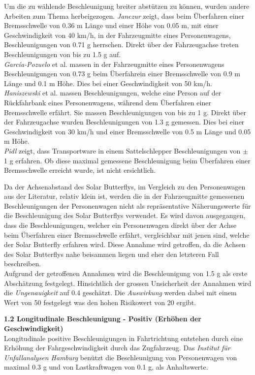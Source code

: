 \begin{description}
    Um die zu wählende Beschleunigung breiter abstützen zu können, wurden andere Arbeiten zum Thema herbeigezogen. \emph{Janczur} \cite{Beschl.1} zeigt, dass beim Überfahren einer Bremsschwelle von 0.36 m Länge und einer Höhe von 0.05 m, mit einer Geschwindigkeit von 40 km/h, in der Fahrzeugmitte eines Personenwagens, Beschleunigungen von 0.71 g herrschen. Direkt über der Fahrzeugachse treten Beschleunigungen von bis zu 1.5 g auf.\\
    \emph{García-Pozuelo} et al. \cite{Beschl.2} massen in der Fahrzeugmitte eines Personenwagens Beschleunigungen von 0.73 g beim Überfahrein einer Bremsschwelle von 0.9 m Länge und 0.1 m Höhe. Dies bei einer Geschwindigkeit von 50 km/h.\\
    \emph{Haniszewski} et al. \cite{Beschl.3} massen Beschleunigungen, welche eine Person auf der Rückfahrbank eines Personenwagens, während dem Überfahren einer Bremsschwelle erfährt. Sie massen Beschleunigungen von bis zu 1 g. Direkt über der Fahrzeugachse wurden Beschleunigungen von 1.3 g gemessen. Dies bei einer Geschwindigkeit von 30 km/h und einer Bremsschwelle von 0.5 m Länge und 0.05 m Höhe.\\
    \emph{Pidl} \cite{Beschl.4} zeigt, dass Transportware in einem Sattelschlepper Beschleunigungen von $\pm$ 1 g erfahren. Ob diese maximal gemessene Beschleunigung beim Überfahren einer Bremsschwelle erreicht wurde, ist nicht ersichtlich.

    Da der Achsenabstand des Solar Butterflys, im Vergleich zu den Personenwagen aus der Literatur, relativ klein ist, werden die in der Fahrzeugmitte gemessenen Beschleunigungen der Personenwagen nicht als repräsentative Näherungswerte für die Beschleunigung des Solar Butterflys verwendet. Es wird davon ausgegangen, dass die Beschleunigungen, welcher ein Personenwagen direkt über der Achse beim Überfahren einer Bremsschwelle erfährt, vergleichbar mit jenen sind, welche der Solar Butterfly erfahren wird. Diese Annahme wird getroffen, da die Achsen des Solar Butterflys nahe beisammen liegen und eher den letzteren Fall beschreiben.\\
    Aufgrund der getroffenen Annahmen wird die Beschleunigung von 1.5 g als erste Abschätzung festgelegt. Hinsichtlich der grossen Unsicherheit der Annahmen wird die \emph{Ungenauigkeit} auf 0.4 geschätzt. Die \emph{Auswirkung} werden dabei mit einem Wert von 50 festgelegt was den hohen Risikowert von 20 ergibt.

    \item \textbf{1.2 Longitudinale Beschleunigung - Positiv (Erhöhen der Geschwindigkeit)}\\
    Longitudinale positive Beschleunigungen in Fahrtrichtung entstehen durch eine Erhöhung der Fahrgeschwindigkeit durch das Zugfahrzeug. Das \emph{Institut für Unfallanalysen Hamburg} \cite{Verz.3} benützt die Beschleunigung von Personenwagen von maximal 0.3 g und von Lastkraftwagen von 0.1 g, als Anhaltswerte.


\end{description}
